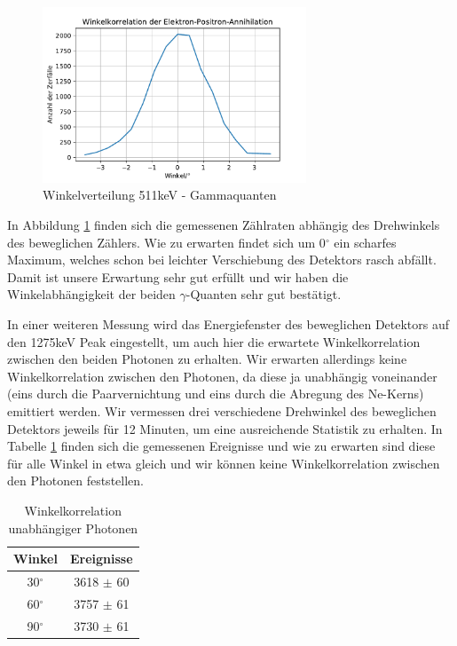 \documentclass[11pt]{scrartcl}
\begin{document}
\begin{figure}[htbp]  
     \includegraphics[width=0.7\textwidth]{Winkelkorrelation_der_Elektron-Positron-Annihilation.pdf}
  \caption{Winkelverteilung 511keV - Gammaquanten}
  \label{511}
\end{figure}

In Abbildung \ref{511} finden sich die gemessenen Zählraten abhängig des Drehwinkels des beweglichen Zählers. Wie zu erwarten findet sich um 0$^\circ$ ein scharfes Maximum, welches schon bei leichter Verschiebung des Detektors rasch abfällt. Damit ist unsere Erwartung sehr gut erfüllt und wir haben die Winkelabhängigkeit der beiden $\gamma$-Quanten sehr gut bestätigt. 

In einer weiteren Messung wird das Energiefenster des beweglichen Detektors auf den 1275keV Peak eingestellt, um auch hier die erwartete Winkelkorrelation zwischen den beiden Photonen zu erhalten. Wir erwarten allerdings keine Winkelkorrelation zwischen den Photonen, da diese ja unabhängig voneinander (eins durch die Paarvernichtung und eins durch die Abregung des Ne-Kerns) emittiert werden. Wir vermessen drei verschiedene Drehwinkel des beweglichen Detektors jeweils für 12 Minuten, um eine ausreichende Statistik zu erhalten. In Tabelle \ref{Vergleich} finden sich die gemessenen Ereignisse und wie zu erwarten sind diese für alle Winkel in etwa gleich und wir können keine Winkelkorrelation zwischen den Photonen feststellen.

\begin{table}[h]
	\caption{Winkelkorrelation unabhängiger Photonen}
	\begin{tabular}{|c|c|}
	\hline
	 Winkel & Ereignisse\\ \hline
	 30$^\circ$ & 3618 $\pm$ 60\\ \hline
	 60$^\circ$ & 3757 $\pm$ 61\\ \hline
	 90$^\circ$ & 3730 $\pm$ 61\\ \hline
	\end{tabular}
\label{Vergleich}
\end{table}
\end{document}
